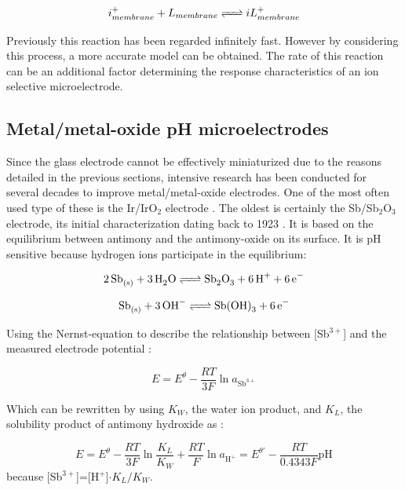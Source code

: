 \begin{equation}
  i^+_{membrane} + L_{membrane} \ce{<=>} iL^+_{membrane}
  \label{eq:ligand_reaction}
\end{equation}

Previously this reaction has been regarded infinitely fast.
However by considering this process, a more accurate model can be obtained.
The rate of this reaction can be an additional factor determining the response characteristics of an ion selective microelectrode.

\subsection{Metal/metal-oxide pH microelectrodes}
Since the glass electrode cannot be effectively miniaturized due to the reasons detailed in the previous sections, intensive research has been conducted for several decades to improve metal/metal-oxide electrodes.
One of the most often used type of these is the Ir/IrO$_2$ electrode \cite{beyenal2004improved}.
The oldest is certainly the Sb/Sb$_2$O$_3$ electrode, its initial characterization dating back to 1923 \cite{uhl1923electrometric}.
It is based on the equilibrium between antimony and the antimony-oxide on its surface.
It is pH sensitive because hydrogen ions participate in the equilibrium:

\begin{equation}
        \ce{2Sb_{(s)} + 3H_2O <=> Sb_2O_3 + 6H^+ + 6e^-}
\end{equation}

\begin{equation}
        \ce{Sb_{(s)} + 3OH^- <=> Sb(OH)_3 + 6e^-}
\end{equation}

Using the Nernst-equation to describe the relationship between [Sb$^{3+}$] and the measured electrode potential \cite{kurzweil2009metal}:

\begin{equation}
E = E^\theta - \frac{RT}{3F}\ln a_{\textrm{Sb}^{3+}}
\end{equation}

Which can be rewritten by using $K_W$, the water ion product, and $K_L$, the solubility product of antimony hydroxide as \cite{kurzweil2009metal}:

\begin{equation}
E = E^\theta - \frac{RT}{3F}\ln \frac{K_L}{K_W} + \frac{RT}{F}\ln a_{\textrm{H}^+}
= E^{\theta '} - \frac{RT}{0.4343F} \textrm{pH}  
\end{equation}
because [Sb$^{3+}$]=[H$^+$]$\cdot K_L / K_W$.


